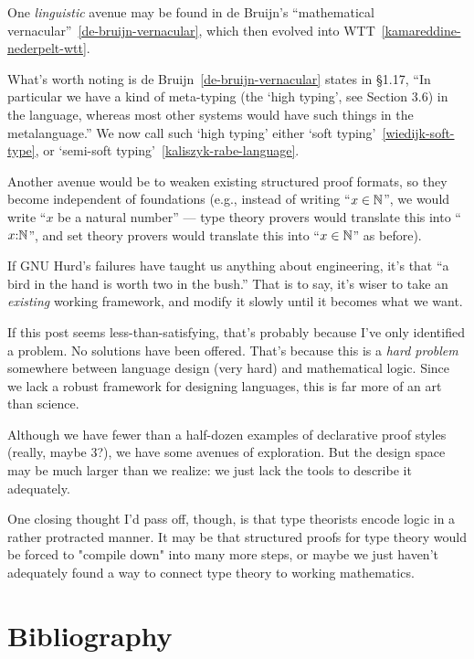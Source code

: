 \M
One \emph{linguistic} avenue may be found in de Bruijn's ``mathematical
vernacular''~\ref{de-bruijn-vernacular}, which then evolved into
WTT~\ref{kamareddine-nederpelt-wtt}. 

\begin{remark}
What's worth noting is de Bruijn~\ref{de-bruijn-vernacular} states
in \S{1.17}, ``In particular we have a kind of meta-typing (the `high
typing', see Section {3.6}) in the language, whereas most other systems
would have such things in the metalanguage.'' We now call such `high
typing' either `soft typing'~\ref{wiedijk-soft-type}, or `semi-soft
typing'~\ref{kaliszyk-rabe-language}.
\end{remark}

\M
Another avenue would be to weaken existing structured proof formats, so
they become independent of foundations (e.g., instead of writing
``$x\in\mathbb{N}$'', we would write ``$x$ be a natural number'' --- type
theory provers would translate this into ``$x{:}\mathbb{N}$'', and set theory
provers would translate this into ``$x\in\mathbb{N}$'' as before).

If GNU Hurd's failures have taught us anything about engineering, it's
that ``a bird in the hand is worth two in the bush.'' That is to say,
it's wiser to take an \emph{existing} working framework, and modify it
slowly until it becomes what we want.

If this post seems less-than-satisfying, that's probably because I've
only identified a problem.  No solutions have been offered. That's
because this is a \emph{hard problem} somewhere between language design
(very hard) and mathematical logic.  Since we lack a robust framework
for designing languages, this is far more of an art than science.

Although we have fewer than a half-dozen examples of declarative proof
styles (really, maybe 3?), we have some avenues of exploration. But the
design space may be much larger than we realize: we just lack the tools
to describe it adequately.

One closing thought I'd pass off, though, is that type theorists encode
logic in a rather protracted manner. It may be that structured proofs
for type theory would be forced to "compile down" into many more steps,
or maybe we just haven't adequately found a way to connect type theory
to working mathematics.

\section{Bibliography}

